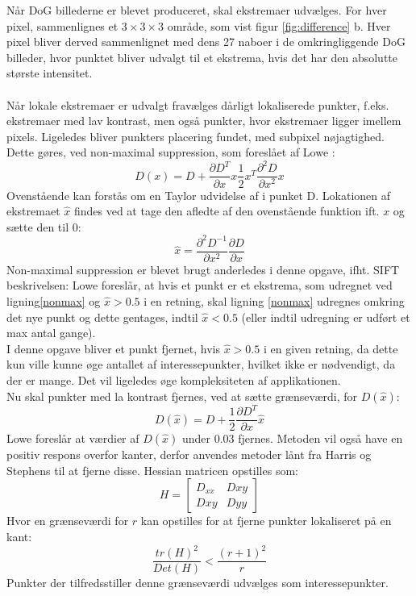 Når DoG billederne er blevet produceret, skal ekstremaer udvælges. For hver pixel, sammenlignes et $3\times3\times3$ område, som vist figur \ref{fig:difference} b. Hver pixel bliver derved sammenlignet med dens 27 naboer i de omkringliggende DoG billeder, hvor punktet bliver udvalgt til et ekstrema, hvis det har den absolutte største intensitet. 
\\
\\
Når lokale ekstremaer er udvalgt fravælges dårligt lokaliserede punkter, f.eks. ekstremaer med lav kontrast, men også punkter, hvor ekstremaer ligger imellem pixels. Ligeledes bliver punkters placering fundet, med subpixel nøjagtighed. Dette gøres, ved non-maximal suppression, som foreslået af Lowe \cite{nonmaximalsuppression}:
\begin{equation}
D(x)=D+\dfrac{\partial D^T}{\partial x}x\dfrac{1}{2}x^T\dfrac{\partial^2D}{\partial x^2}x
\label{nonmax}
\end{equation}
Ovenstående kan forstås om en Taylor udvidelse af i punket D.
Lokationen af ekstremaet $\hat{x}$ findes ved at tage den afledte af den ovenstående funktion ift. $x$ og sætte den til 0:
\begin{equation}
\hat{x}= \dfrac{\partial^2 D^{-1}}{\partial x^2}\dfrac{\partial D}{\partial x}
\end{equation}
Non-maximal suppression er blevet brugt anderledes i denne opgave, ifht. SIFT beskrivelsen: Lowe foreslår, at hvis et punkt er et ekstrema, som udregnet ved ligning\ref{nonmax} og $\hat{x} > 0.5$ i en retning, skal ligning \ref{nonmax} udregnes omkring det nye punkt og dette gentages, indtil $\hat{x} < 0.5$ (eller indtil udregning er udført et max antal gange).
\\
I denne opgave bliver et punkt fjernet, hvis $\hat{x} > 0.5$ i en given retning, da dette kun ville kunne øge antallet af interessepunkter, hvilket ikke er nødvendigt, da der er mange. Det vil ligeledes øge kompleksiteten af applikationen.
\\
Nu skal punkter med la kontrast fjernes, ved at sætte grænseværdi, for $D(\hat{x})$:
\begin{equation}
D(\hat{x})=D+\dfrac{1}{2}\dfrac{\partial D^T}{\partial x}\hat{x}
\end{equation}
Lowe foreslår at værdier af $D(\hat{x})$ under 0.03 fjernes. Metoden vil også have en positiv respons overfor kanter, derfor anvendes metoder lånt fra Harris og Stephens \cite{harris} til at fjerne disse. Hessian matricen opstilles som:
\begin{equation}
H =
\begin{bmatrix}
D_{xx} & D{xy} \\
D{xy} & D{yy}
\end{bmatrix}
\end{equation}
Hvor en grænseværdi for $r$ kan opstilles for at fjerne punkter lokaliseret på en kant:
\begin{equation}
\dfrac{tr(H)^2}{Det(H)}<\dfrac{(r+1)^2}{r}
\end{equation}
Punkter der tilfredsstiller denne grænseværdi udvælges som interessepunkter. 
